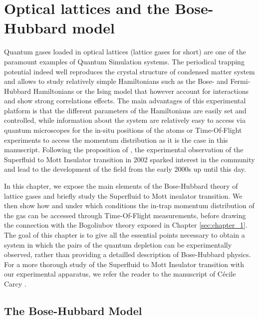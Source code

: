 
\chapter{Optical lattices and the Bose-Hubbard model}

\label{sec:chapter_2}

Quantum gases loaded in optical lattices (lattice gases for short) are one of the paramount examples of Quantum Simulation systems. The periodical trapping potential indeed well reproduces the crystal structure of condensed matter system and allows to study relatively simple Hamiltonians such as the Bose- and Fermi-Hubbard Hamiltonians or the Ising model \cite{bloch2005ultracold} that however account for interactions and show strong correlations effects. The main advantages of this experimental platform is that the different parameters of the Hamiltonians are easily set and controlled, while information about the system are relatively easy to access via quantum microscopes \cite{bakr2009quantum} for the in-situ positions of the atoms or Time-Of-Flight experiments to access the momentum distribution as it is the case in this manuscript. Following the proposition of \cite{jaksch1998cold}, the experimental observation of the Superfluid to Mott Insulator transition in 2002 \cite{greiner2002quantum} sparked interest in the community and lead to the development of the field from the early 2000s up until this day.

In this chapter, we expose the main elements of the Bose-Hubbard theory of lattice gases and briefly study the Superfluid to Mott insulator transition. We then show how and under which conditions the in-trap momentum distribution of the gas can be accessed through Time-Of-Flight measurements, before drawing the connection with the Bogoliubov theory exposed in Chapter \ref{sec:chapter_1}. The goal of this chapter is to give all the essential points necessary to obtain a system in which the \kmk pairs of the quantum depletion can be experimentally observed, rather than providing a detailled description of Bose-Hubbard physics. For a more thorough study of the Superfluid to Mott Insulator transition with our experimental apparatus, we refer the reader to the manuscript of Cécile Carcy \cite{carcy_these}.




\section{The Bose-Hubbard Model}

